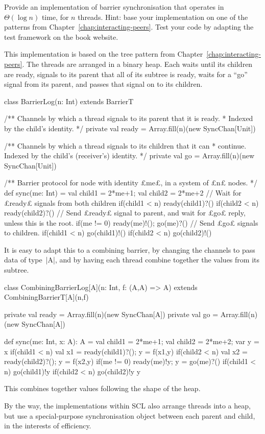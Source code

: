 \begin{questionS}
\label{ex:barrierLog}
Provide an implementation of barrier synchronisation that operates in
$\Theta(\log n)$ time, for $n$ threads.  Hint: base your implementation on one
of the patterns from Chapter~\ref{chap:interacting-peers}.  Test your code by
adapting the test framework on the book website.
\end{questionS}


\begin{answerS}
This implementation is based on the tree pattern from
Chapter~\ref{chap:interacting-peers}.
%
The threads are arranged in a binary heap.  Each waits until its children
are ready, signals to its parent that all of its subtree is ready, waits for a
``go'' signal from its parent, and passes that signal on to its children.
%
\begin{scala}
class BarrierLog(n: Int) extends BarrierT{
  /** Channels by which a thread signals to its parent that it is ready.
    * Indexed by the child's identity. */ 
  private val ready = Array.fill(n)(new SyncChan[Unit])

  /** Channels by which a thread signals to its children that it can
    * continue.  Indexed by the child's (receiver's) identity. */ 
  private val go = Array.fill(n)(new SyncChan[Unit])

  /** Barrier protocol for node with identity £me£, in a system of £n£ nodes. */
  def sync(me: Int) = {
    val child1 = 2*me+1; val child2 = 2*me+2
    // Wait for £ready£ signals from both children
    if(child1 < n) ready(child1)?()
    if(child2 < n) ready(child2)?()
    // Send £ready£ signal to parent, and wait for £go£ reply, unless this is the root.
    if(me != 0){ ready(me)!(); go(me)?() }
    // Send £go£ signals to children.
    if(child1 < n) go(child1)!()
    if(child2 < n) go(child2)!()
  }
}
\end{scala}

It is easy to adapt this to a combining barrier, by changing the channels to
pass data of type~|A|, and by having each thread combine together the values
from its subtree.
%
\begin{scala}
class CombiningBarrierLog[A](n: Int, f: (A,A) => A) 
    extends CombiningBarrierT[A](n,f){
  private val ready = Array.fill(n)(new SyncChan[A])
  private val go = Array.fill(n)(new SyncChan[A])

  def sync(me: Int, x: A): A = {
    val child1 = 2*me+1; val child2 = 2*me+2; var y = x
    if(child1 < n){ val x1 = ready(child1)?(); y = f(x1,y) }
    if(child2 < n){ val x2 = ready(child2)?(); y = f(x2,y) }
    if(me != 0){ ready(me)!y; y = go(me)?() }
    if(child1 < n) go(child1)!y
    if(child2 < n) go(child2)!y
    y
  }
}
\end{scala}
%
This combines together values following the shape of the heap.

By the way, the implementations within SCL also arrange threads into a heap,
but use a special-purpose synchronisation object between each parent and
child, in the interests of efficiency.
\end{answerS}
